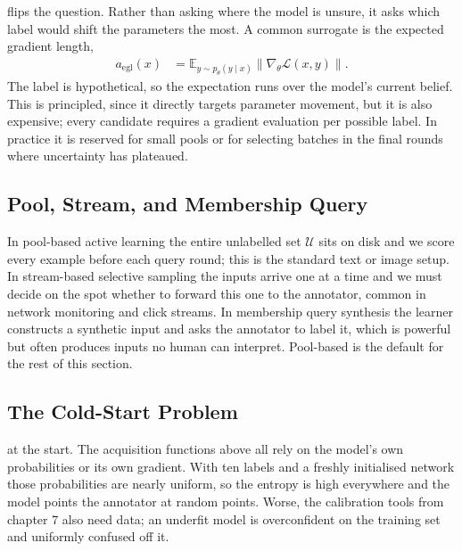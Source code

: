  flips the question. Rather than asking where the model is unsure, it asks which label would shift the parameters the most. A common surrogate is the expected gradient length,
\begin{align*}
    a_{\text{egl}}(x) &= \mathbb{E}_{y \sim p_\theta(y \mid x)} \bigl\| \nabla_\theta \mathcal{L}(x, y) \bigr\|.
\end{align*}
The label is hypothetical, so the expectation runs over the model's current belief. This is principled, since it directly targets parameter movement, but it is also expensive; every candidate requires a gradient evaluation per possible label. In practice it is reserved for small pools or for selecting batches in the final rounds where uncertainty has plateaued.

\subsection{Pool, Stream, and Membership Query}

 In pool-based active learning the entire unlabelled set $\mathcal{U}$ sits on disk and we score every example before each query round; this is the standard text or image setup. In stream-based selective sampling the inputs arrive one at a time and we must decide on the spot whether to forward this one to the annotator, common in network monitoring and click streams. In membership query synthesis the learner constructs a synthetic input and asks the annotator to label it, which is powerful but often produces inputs no human can interpret. Pool-based is the default for the rest of this section.

\subsection{The Cold-Start Problem}


 at the start. The acquisition functions above all rely on the model's own probabilities or its own gradient. With ten labels and a freshly initialised network those probabilities are nearly uniform, so the entropy is high everywhere and the model points the annotator at random points. Worse, the calibration tools from chapter 7 also need data; an underfit model is overconfident on the training set and uniformly confused off it.

